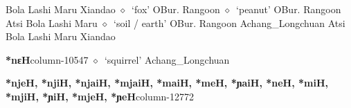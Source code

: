          Bola 
\hspace{1ex}
         Lashi 
\hspace{1ex}
         Maru 
\hspace{1ex}
         Xiandao 
\hspace{1ex}
         $\diamond$~`fox'
         OBur. 
\hspace{1ex}
         Rangoon 
\hspace{1ex}
         $\diamond$~`peanut'
         OBur. 
\hspace{1ex}
         Rangoon 
\hspace{1ex}
         Atsi 
\hspace{1ex}
         Bola 
\hspace{1ex}
         Lashi 
\hspace{1ex}
         Maru 
\hspace{1ex}
         $\diamond$~`soil / earth'
         OBur. 
\hspace{1ex}
         Rangoon 
\hspace{1ex}
         Achang\_Longchuan 
\hspace{1ex}
         Atsi 
\hspace{1ex}
         Bola 
\hspace{1ex}
         Lashi 
\hspace{1ex}
         Maru 
\hspace{1ex}
         Xiandao 
  \item {\footnotesize \textbf{*nɛH}}{\tiny column-10547}
         $\diamond$~`squirrel'
         Achang\_Longchuan 
  \item {\footnotesize \textbf{*njeH, *njiH, *njaiH, *mjaiH, *maiH, *meH, *ɲaiH, *neH, *miH, *mjiH, *ɲiH, *mjeH, *ɲeH}}{\tiny column-12772}
